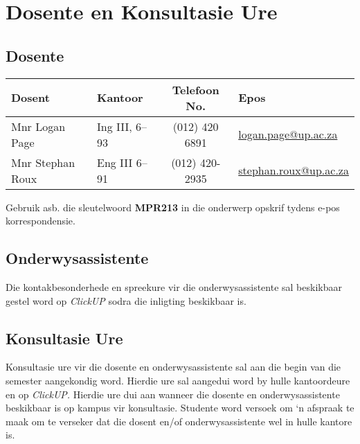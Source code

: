 \section{Dosente en Konsultasie Ure}
    \subsection{Dosente}
        \begin{table}[!h]
            \begin{center}
             \begin{tabular}{|l|l|c|l|}
                 \hline
                 {\bf Dosent} & {\bf Kantoor} & {\bf Telefoon No.} & {\bf Epos} \\
                 \hline
                 Mnr Logan Page &
                 Ing III, 6--93 &
                 (012) 420 6891 &
                 \href{mailto:logan.page@up.ac.za}{logan.page@up.ac.za} \\
                 Mnr Stephan Roux &
                 Eng III 6--91 &
                 (012) 420-2935 &
                 \href{mailto:stephan.roux@up.ac.za}{stephan.roux@up.ac.za} \\
                 \hline
             \end{tabular}
            \end{center}
        \end{table}

        Gebruik asb. die sleutelwoord \textbf{MPR213} in die onderwerp opskrif
        tydens e-pos korrespondensie.

    \subsection{Onderwysassistente}
        Die kontakbesonderhede en spreekure vir die onderwysassistente sal
        beskikbaar gestel word op \textit{ClickUP} sodra die inligting
        beskikbaar is.

    \subsection{Konsultasie Ure}
        Konsultasie ure vir die dosente en onderwysassistente sal aan die begin
        van die semester aangekondig word.  Hierdie ure sal aangedui word by
        hulle kantoordeure en op \textit{ClickUP.}  Hierdie ure dui aan wanneer
        die dosente en onderwysassistente beskikbaar is op kampus vir
        konsultasie.  Studente word versoek om `n afspraak te maak om te
        verseker dat die dosent en/of onderwysassistente wel in hulle kantore
        is.

